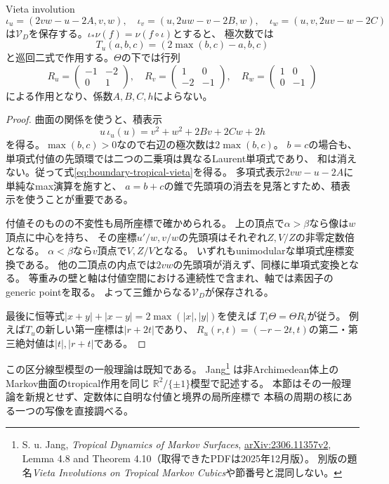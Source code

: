 \begin{theorem}[Vieta作用の境界線型化]
\label{thm:boundary-vieta-linearization}
Vieta involution
\[
 \iota_u=(2vw-u-2A,v,w),\quad
 \iota_v=(u,2uw-v-2B,w),\quad
 \iota_w=(u,v,2uv-w-2C)
\]
は$\mathcal V_D$を保存する。$\iota_*\nu(f)=\nu(f\circ\iota)$とすると、
極次数では
\begin{equation}\label{eq:boundary-tropical-vieta}
 T_u(a,b,c)=(2\max(b,c)-a,b,c)
\end{equation}
と巡回二式で作用する。$\Theta$の下では行列
\[
 R_u=\begin{pmatrix}-1&-2\\0&1\end{pmatrix},\quad
 R_v=\begin{pmatrix}1&0\\-2&-1\end{pmatrix},\quad
 R_w=\begin{pmatrix}1&0\\0&-1\end{pmatrix}
\]
による作用となり、係数$A,B,C,h$によらない。
\end{theorem}
\begin{proof}
曲面の関係を使うと、積表示
\begin{equation}\label{eq:boundary-vieta-product}
 u\,\iota_u(u)=v^2+w^2+2Bv+2Cw+2h
\end{equation}
を得る。$\max(b,c)>0$なので右辺の極次数は$2\max(b,c)$。
$b=c$の場合も、単項式付値の先頭環では二つの二乗項は異なるLaurent単項式であり、
和は消えない。従って式\eqref{eq:boundary-tropical-vieta}を得る。
多項式表示$2vw-u-2A$に単純なmax演算を施すと、
$a=b+c$の錐で先頭項の消去を見落とすため、積表示を使うことが重要である。

付値そのものの不変性も局所座標で確かめられる。
上の頂点で$\alpha>\beta$なら像は$w$頂点に中心を持ち、
その座標$u'/w,v/w$の先頭項はそれぞれ$Z,V/Z$の非零定数倍となる。
$\alpha<\beta$なら$v$頂点で$V,Z/V$となる。
いずれもunimodularな単項式座標変換である。
他の二頂点の内点では$2vw$の先頭項が消えず、同様に単項式変換となる。
等重みの壁と軸は付値空間における連続性で含まれ、軸では素因子のgeneric pointを取る。
よって三錐からなる$\mathcal V_D$が保存される。

最後に恒等式$|x+y|+|x-y|=2\max(|x|,|y|)$を使えば
$T_i\Theta=\Theta R_i$が従う。
例えば$T_u$の新しい第一座標は$|r+2t|$であり、
$R_u(r,t)=(-r-2t,t)$の第二・第三絶対値は$|t|,|r+t|$である。
\end{proof}

この区分線型模型の一般理論は既知である。
Jang\footnote{S. u. Jang, \emph{Tropical Dynamics of Markov Surfaces},
\href{https://arxiv.org/abs/2306.11357v2}{arXiv:2306.11357v2},
Lemma 4.8 and Theorem 4.10（取得できたPDFは2025年12月版）。
別版の題名\emph{Vieta Involutions on Tropical Markov Cubics}や節番号と混同しない。}
は非Archimedean体上のMarkov曲面のtropical作用を同じ
$\mathbb R^2/\{\pm1\}$模型で記述する。
本節はその一般理論を新規とせず、定数体に自明な付値と境界の局所座標で
本稿の周期の核にある一つの写像を直接調べる。

